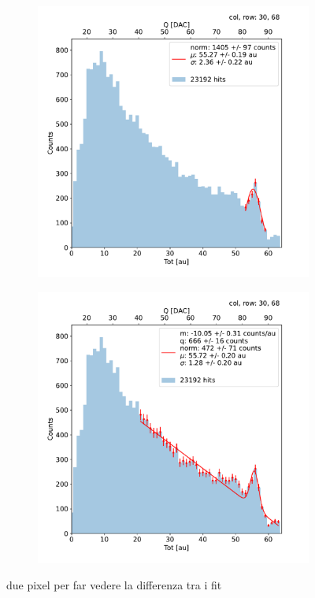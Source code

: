         \begin{figure}[h!]
            \begin{subfigure}{.5\textwidth}
            \centering
            \includegraphics[width=.99\linewidth]{figures/charaterization/fit_gauss_r69.pdf}
            \label{fig:}
            \end{subfigure}
            \begin{subfigure}{.5\textwidth}
            \centering
            \includegraphics[width=.99\linewidth]{figures/charaterization/fit_line_gauss_r69.pdf}
            \label{fig:}
            \end{subfigure}
            \caption{due pixel per far vedere la differenza tra i fit}
        \end{figure}            

